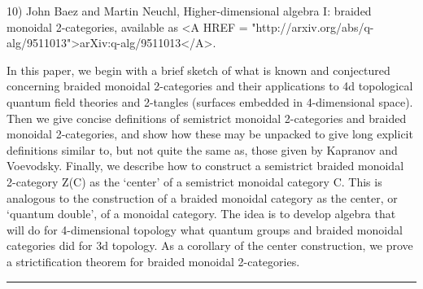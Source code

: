 10) John Baez and Martin Neuchl, Higher-dimensional algebra I: braided
monoidal 2-categories, available as <A HREF =
"http://arxiv.org/abs/q-alg/9511013">arXiv:q-alg/9511013</A>.

In this paper, we begin with a brief sketch of what is known and
conjectured concerning 
braided monoidal 2-categories and their applications to 4d topological
quantum field theories and 2-tangles (surfaces embedded in 4-dimensional
space).  Then we give concise definitions of semistrict monoidal
2-categories and braided monoidal 2-categories, and show how these may
be unpacked to give long explicit definitions similar to, but not quite
the same as, those given by Kapranov and Voevodsky.  Finally, we describe
how to construct a semistrict braided monoidal 2-category Z(C) as the
`center' of a semistrict monoidal category C.  This is analogous to the
construction of a braided monoidal category as the center, or `quantum
double', of a monoidal category.  The idea is to develop algebra that
will do for 4-dimensional topology what quantum groups and braided
monoidal categories did for 3d topology.  As a corollary of the center
construction, we prove a strictification theorem for braided monoidal
2-categories.   

\par\noindent\rule{\textwidth}{0.4pt}

